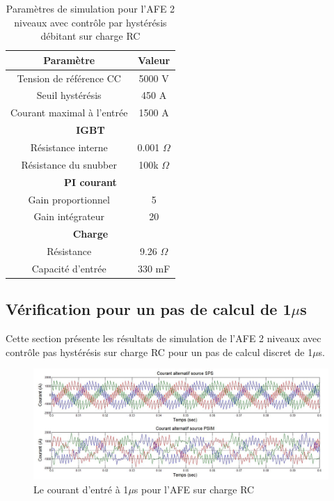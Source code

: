 \documentclass[11pt,letterpaper,final]{report}
\begin{document}
\begin{table}[htb]
\centering
\begin{tabular}{|c|c|} 
  \hline
  \textbf{Paramètre} & \textbf{Valeur}  \\
  \hline\hline
  Tension de référence CC & 5000 V\\ \hline
  Seuil hystérésis & 450 A\\ \hline
  Courant maximal à l'entrée& 1500 A \\ \hline \hline
  \multicolumn{2}{|c|}{\textbf{IGBT}}\\ \hline
  Résistance interne & 0.001 $\Omega$\\
  Résistance du snubber & 100k $\Omega$\\ \hline \hline
   \multicolumn{2}{|c|}{\textbf{PI courant}}\\ \hline
  Gain proportionnel & 5 \\
  Gain intégrateur & 20 \\ \hline \hline
  \multicolumn{2}{|c|}{\textbf{Charge}}\\ \hline
  Résistance & 9.26 $\Omega$ \\
  Capacité d'entrée & 330 mF\\
  \hline
\end{tabular}
\caption{Paramètres de simulation pour l'AFE 2 niveaux avec contrôle par hystérésis débitant sur charge RC}
\label{p_AF_RC}
\end{table}


\subsection{Vérification pour un pas de calcul de 1$\mu$s}
Cette section présente les résultats de simulation de l'AFE 2 niveaux avec contrôle pas hystérésis sur charge RC pour un pas de calcul discret de 1$\mu$s. 




\begin{figure}[htb]
\centering
\includegraphics[scale=0.5]{Fig/AFERC/cour_al.jpg}
\caption{Le courant d'entré à 1$\mu$s pour l'AFE sur charge RC}
\label{AF_RC_cou}
\end{figure}
\end{document}
